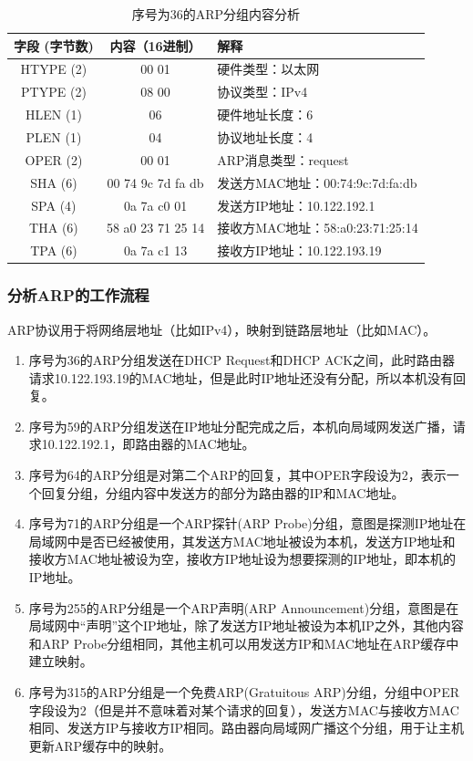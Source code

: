 \documentclass[lang=cn,11pt,a4paper,cite=authornum]{paper}
\begin{document}
\begin{table}[!htbp]
    \centering
    \caption{序号为36的ARP分组内容分析\label{tab:arpres}}
    \begin{tabular}{|c|c|l|}
        \hline
        字段 (字节数) & 内容（16进制） & 解释 \\
        \hline
        HTYPE (2) & 00 01 & 硬件类型：以太网 \\
        \hline
        PTYPE (2) & 08 00 & 协议类型：IPv4 \\
        \hline
        HLEN (1) & 06 & 硬件地址长度：6 \\
        \hline
        PLEN (1) & 04 & 协议地址长度：4 \\
        \hline
        OPER (2) & 00 01 & ARP消息类型：request \\
        \hline
        SHA (6) & 00 74 9c 7d fa db & 发送方MAC地址：00:74:9c:7d:fa:db \\
        \hline
        SPA (4) & 0a 7a c0 01 & 发送方IP地址：10.122.192.1 \\
        \hline
        THA (6) & 58 a0 23 71 25 14 & 接收方MAC地址：58:a0:23:71:25:14 \\
        \hline
        TPA (6) & 0a 7a c1 13 & 接收方IP地址：10.122.193.19 \\
        \hline
    \end{tabular}
\end{table}

\subsubsection{分析ARP的工作流程}

ARP协议用于将网络层地址（比如IPv4），映射到链路层地址（比如MAC）。

\begin{enumerate}
    \item 序号为36的ARP分组发送在DHCP Request和DHCP ACK之间，此时路由器请求10.122.193.19的MAC地址，但是此时IP地址还没有分配，所以本机没有回复。
    \item 序号为59的ARP分组发送在IP地址分配完成之后，本机向局域网发送广播，请求10.122.192.1，即路由器的MAC地址。
    \item 序号为64的ARP分组是对第二个ARP的回复，其中OPER字段设为2，表示一个回复分组，分组内容中发送方的部分为路由器的IP和MAC地址。
    \item 序号为71的ARP分组是一个ARP探针(ARP Probe)分组，意图是探测IP地址在局域网中是否已经被使用，其发送方MAC地址被设为本机，发送方IP地址和接收方MAC地址被设为空，接收方IP地址设为想要探测的IP地址，即本机的IP地址。
    \item 序号为255的ARP分组是一个ARP声明(ARP Announcement)分组，意图是在局域网中“声明”这个IP地址，除了发送方IP地址被设为本机IP之外，其他内容和ARP Probe分组相同，其他主机可以用发送方IP和MAC地址在ARP缓存中建立映射。
    \item 序号为315的ARP分组是一个免费ARP(Gratuitous ARP)分组，分组中OPER字段设为2（但是并不意味着对某个请求的回复），发送方MAC与接收方MAC相同、发送方IP与接收方IP相同。路由器向局域网广播这个分组，用于让主机更新ARP缓存中的映射。
\end{enumerate}
\end{document}
